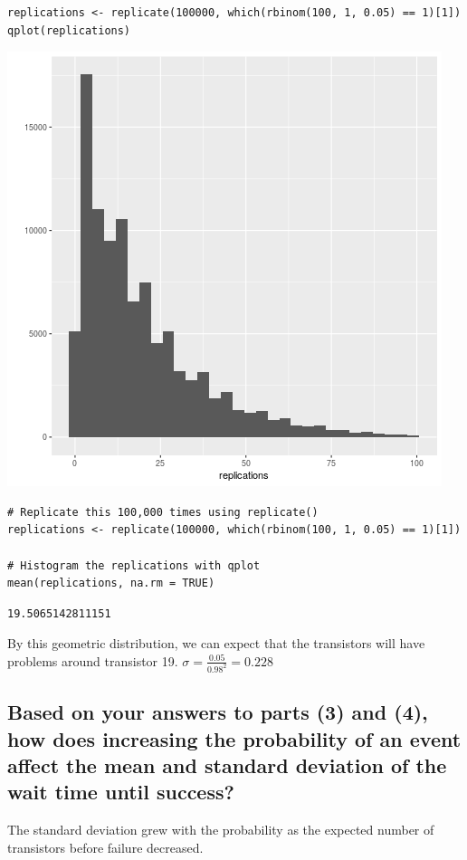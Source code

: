 \documentclass[11pt]{article}
\begin{document}
\begin{verbatim}
replications <- replicate(100000, which(rbinom(100, 1, 0.05) == 1)[1])
qplot(replications)
\end{verbatim}

\begin{center}
\includegraphics[width=.9\linewidth]{geom.png}
\end{center}

\begin{verbatim}
# Replicate this 100,000 times using replicate()
replications <- replicate(100000, which(rbinom(100, 1, 0.05) == 1)[1])

# Histogram the replications with qplot
mean(replications, na.rm = TRUE)
\end{verbatim}

\begin{verbatim}
19.5065142811151
\end{verbatim}


By this geometric distribution, we can expect that the transistors will have problems around transistor 19. \(\sigma = \frac{0.05}{0.98^2} = 0.228\)
\subsection{Based on your answers to parts (3) and (4), how does increasing the probability of an event affect the mean and standard deviation of the wait time until success?}
\label{sec:org0b5fc7f}
The standard deviation grew with the probability as the expected number of transistors before failure decreased.
\end{document}
